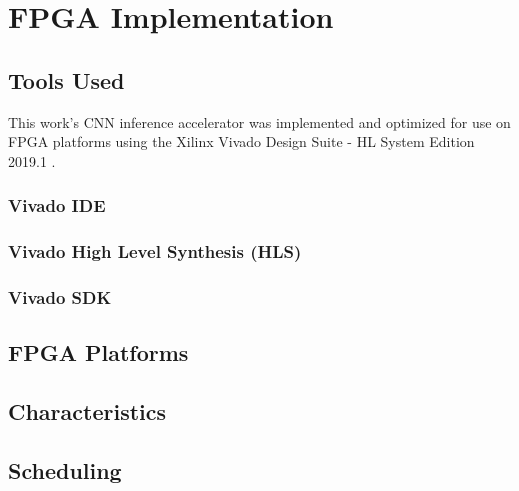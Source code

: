 \chapter{FPGA Implementation}
\label{Chapter-FPGA-Implementation}

\section{Tools Used}
This work's CNN inference accelerator was implemented and optimized for use on FPGA platforms using the Xilinx Vivado Design Suite - HL System Edition 2019.1 \cite{Vivado-Design-Suite}.

\subsection{Vivado IDE}
\subsection{Vivado High Level Synthesis (HLS)}
\subsection{Vivado SDK}

\section{FPGA Platforms}

\section{Characteristics}

\section{Scheduling}
